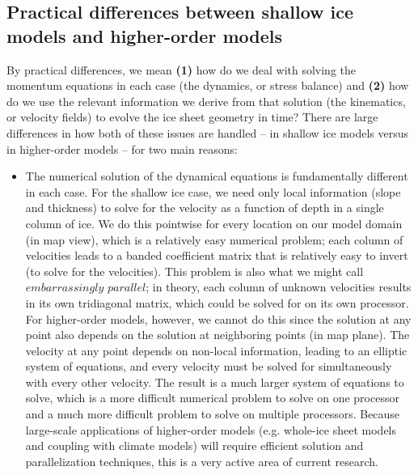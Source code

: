 \subsection{Practical differences between shallow ice models and higher-order models}


By practical differences, we mean \textbf{(1)} how do we deal with solving the momentum equations in each case (the dynamics, or stress balance) and \textbf{(2)} how do we use the relevant information we derive from that solution (the kinematics, or velocity fields) to evolve the ice sheet geometry in time? There are large differences in how both of these issues are handled -- in shallow ice models versus in higher-order models -- for two main reasons:

\begin{itemize}
\item  The numerical solution of the dynamical equations is fundamentally different in each case. For the shallow ice case, we need only local information (slope and thickness) to solve for the velocity as a function of depth in a single column of ice. We do this pointwise for every location on our model domain (in map view), which is a relatively easy numerical problem; each column of velocities leads to a banded coefficient matrix that is relatively easy to invert (to solve for the velocities). This problem is also what we might call $embarrassingly$ $parallel$; in theory, each column of unknown velocities results in its own tridiagonal matrix, which could be solved for on its own processor. For higher-order models, however, we cannot do this since the solution at any point also depends on the solution at neighboring points (in map plane). The velocity at any point depends on non-local information, leading to an elliptic system of equations, and every velocity must be solved for simultaneously with every other velocity. The result is a much larger system of equations to solve, which is a more difficult numerical problem to solve on one processor and a much more difficult problem to solve on multiple processors. Because large-scale applications of higher-order models (e.g. whole-ice sheet models and coupling with climate models) will require efficient solution and parallelization techniques, this is a very active area of current research.  
\end{itemize}

